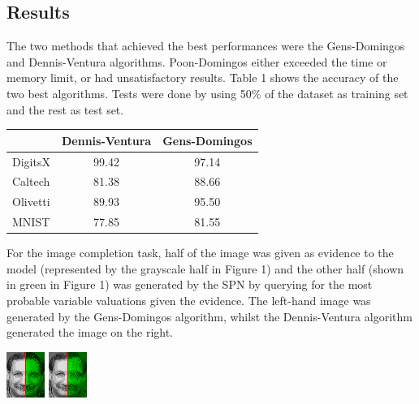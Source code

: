 \documentclass[10pt,a4paper]{article}
\newenvironment{Figure}
  {\par\smallskip\noindent\minipage{\linewidth}}
  {\endminipage\smallskip\par}
\begin{document}
\begin{multicols*}{2}
\section*{Results}


The two methods that achieved the best performances were the Gens-Domingos and Dennis-Ventura
algorithms.  Poon-Domingos either exceeded the time or memory limit, or had unsatisfactory results.
Table 1 shows the accuracy of the two best algorithms. Tests were done by using 50\% of the dataset
as training set and the rest as test set.

\begin{tabular}{l|c|c}
  & Dennis-Ventura & Gens-Domingos\\
  \hline
  DigitsX & 99.42 & 97.14\\
  Caltech & 81.38 & 88.66\\
  Olivetti& 89.93 & 95.50\\
  MNIST   & 77.85 & 81.55\\
\end{tabular}

For the image completion task, half of the image was given as evidence to the model (represented by
the grayscale half in Figure 1) and the other half (shown in green in Figure 1) was generated by
the SPN by querying for the most probable variable valuations given the evidence. The left-hand
image was generated by the Gens-Domingos algorithm, whilst the Dennis-Ventura algorithm generated
the image on the right.

\begin{Figure}
  \centering\includegraphics[scale=8.0]{imgs/gens_cmpl.png}
  \includegraphics[scale=1.925]{imgs/dennis_cmpl.png}\\
  \vspace{-0.2cm}
\end{Figure}


\end{multicols*}
\end{document}
